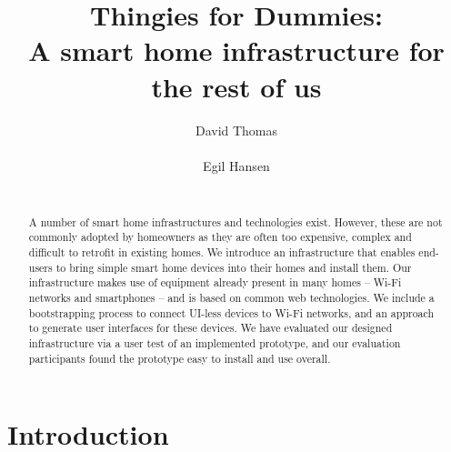 \documentclass{ubicomp2012}
\begin{document}
\setlength{\paperheight}{11in}
\setlength{\paperwidth}{8.5in}
\setlength{\pdfpageheight}{\paperheight}
\setlength{\pdfpagewidth}{\paperwidth}


\title{Thingies for Dummies:\\A smart home infrastructure for the rest of us}
\author{
  \alignauthor David Thomas\\
    \\
 \alignauthor Egil Hansen\\
    \\
      }
\maketitle

\begin{abstract}
A number of smart home infrastructures and technologies exist. However, these are not commonly adopted by homeowners as they are often too expensive, complex and difficult to retrofit in existing homes. We introduce an infrastructure that enables end-users to bring simple smart home devices into their homes and install them. Our infrastructure makes use of equipment already present in many homes -- Wi-Fi networks and smartphones -- and is based on common web technologies. We include a bootstrapping process to connect UI-less devices to Wi-Fi networks, and an approach to generate user interfaces for these devices.
We have evaluated our designed infrastructure via a user test of an implemented prototype, and our evaluation participants found the prototype easy to install and use overall.
\end{abstract}




\section{Introduction}
\end{document}
